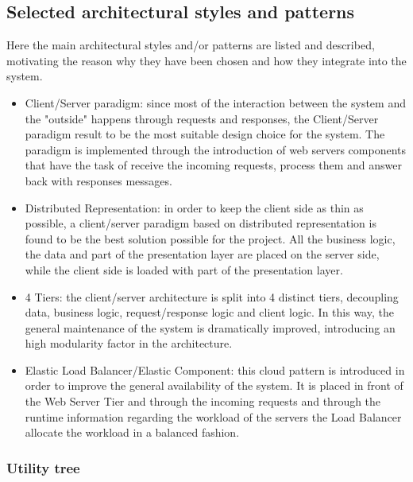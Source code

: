 \subsection{Selected architectural styles and patterns}

\label{sec:selected-styles-patterns}

Here the main architectural styles and/or patterns are listed and described, motivating the reason why they have been chosen and how they integrate into the system.

\begin{itemize}	
	\item Client/Server paradigm: since most of the interaction between the system and the "outside" happens through requests and responses, the Client/Server paradigm result to be the most suitable design choice for the system.
The paradigm is implemented through the introduction of web servers components that have the task of receive the incoming requests, process them and answer back with responses messages.
	\item Distributed Representation: in order to keep the client side as thin as possible, a client/server paradigm based on distributed representation is found to be the best solution possible for the project. All the business logic, the data and part of the presentation layer are placed on the server side, while the client side is loaded with part of the presentation layer.
	\item 4 Tiers: the client/server architecture is split into 4 distinct tiers, decoupling data, business logic, request/response logic and client logic. In this way, the general maintenance of the system is dramatically improved, introducing an high modularity factor in the architecture.
	\item Elastic Load Balancer/Elastic Component: this cloud pattern is introduced in order to improve the general availability of the system. It is placed in front of the Web Server Tier and through the incoming requests and through the runtime information regarding the workload of the servers the Load Balancer allocate the workload in a balanced fashion.
\end{itemize}

	\subsubsection{Utility tree}
